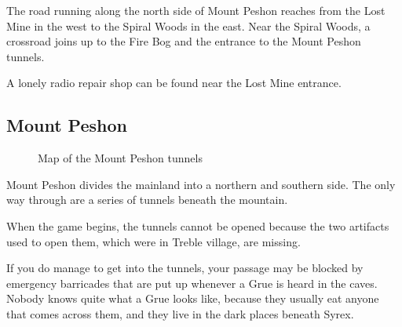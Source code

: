 \documentclass[10pt,twocolumn]{memoir}
\begin{document}
The road running along the north side of Mount Peshon reaches from the Lost Mine
in the west to the Spiral Woods in  the east. Near the Spiral Woods, a crossroad
joins up to the Fire Bog and the entrance to the Mount Peshon tunnels.

A lonely radio repair shop can be found near the Lost Mine entrance.

\subsection{Mount Peshon}

\begin{figure}[ht]
  \begin{center}
  \end{center}
  \caption{Map of the Mount Peshon tunnels}
\end{figure}

Mount Peshon  divides the mainland into  a northern and southern  side. The only
way through are a series of tunnels beneath the mountain.

When the  game begins, the  tunnels cannot be  opened because the  two artifacts
used to open them, which were in Treble village, are missing.

If  you do  manage to  get into  the  tunnels, your  passage may  be blocked  by
emergency barricades  that are  put up whenever  a Grue is  heard in  the caves.
Nobody knows quite what a Grue looks  like, because they usually eat anyone that
comes across them, and they live in the dark places beneath Syrex.
\end{document}
